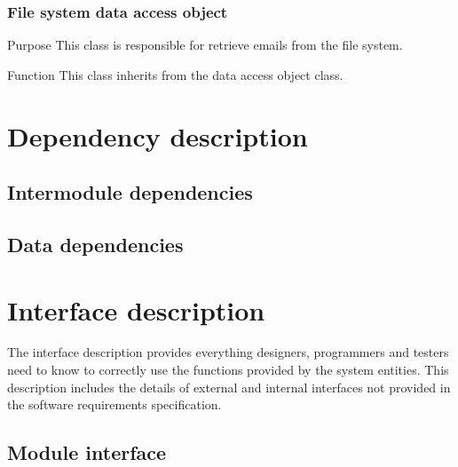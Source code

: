 \documentclass[12pt]{article}
\newenvironment{my_desc}
{\begin{description}
  \setlength{\itemsep}{0cm}
  \setlength{\parskip}{0cm}}
{\end{description}}
\begin{document}
\subsubsection{File system data access object}
  \begin{my_desc}
   \item[Purpose] This class is responsible for retrieve emails from the file system.
   \item[Function] This class inherits from the data access object class.
  \end{my_desc}

\section{Dependency description}
\subsection{Intermodule dependencies}
\subsection{Data dependencies}

\section{Interface description}
The interface description provides everything designers, programmers and testers need to know to correctly use the functions provided by the system entities. This description includes the details of external and internal interfaces not provided in the software requirements speciﬁcation.

\subsection{Module interface}
\end{document}

